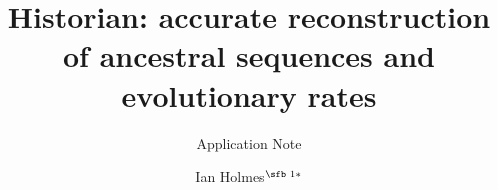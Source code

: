 \documentclass{bioinfo}
\begin{document}


\subtitle{Application Note}
\title[Historian: accurate reconstruction of sequences and rates]{Historian: accurate reconstruction of ancestral sequences and evolutionary rates}
\author[Ian Holmes]{Ian Holmes$^{\text{\sfb 1}*}$}
\address{$^{\text{\sf 1}}$Department of Bioengineering, University of California, Berkeley, 94720, USA.}


\end{document}
